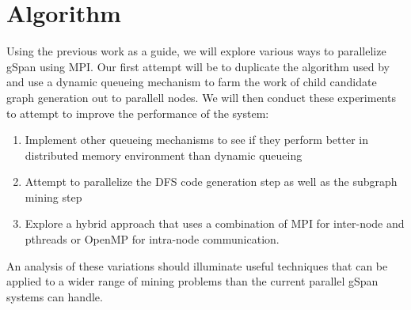 \section{Algorithm}

Using the previous work as a guide, we will explore various ways to 
parallelize gSpan\cite{gspan} using MPI.  Our first attempt will be to 
duplicate the algorithm used by \cite{buehrer2005parallel} and use
a dynamic queueing mechanism to farm the work of child candidate 
graph generation out to parallell nodes.  We will then conduct these 
experiments to attempt to improve the performance of the system:

\begin{enumerate}
	\item{Implement other queueing mechanisms to see if they perform
		better in distributed memory environment than dynamic
		queueing}
	\item{Attempt to parallelize the DFS code generation step as well
		as the subgraph mining step}
	\item{Explore a hybrid approach that uses a combination of 
		MPI for inter-node and pthreads or OpenMP for intra-node
		communication.}
\end{enumerate}

An analysis of these variations should illuminate useful techniques that
can be applied to a wider range of mining problems than the current
parallel gSpan systems can handle.

